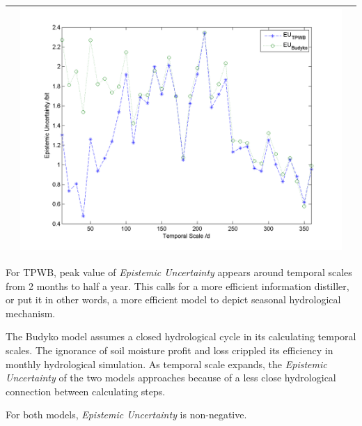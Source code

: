 \documentclass[11pt]{article}
\begin{document}
\begin{table}[H]
{\begin{tabular}{ccc}
&\begin{minipage}{.6\textwidth}\includegraphics[width=\linewidth]{resultgraph/11532500EU.png}\end{minipage}
\\
\bottomrule
\end{tabular}
}
\end{table} 

For TPWB, peak value of \emph{Epistemic Uncertainty} appears around temporal scales from 2 months to half a year. This calls for a more efficient information distiller, or put it in other words, a more efficient model to depict seasonal hydrological mechanism.  


The Budyko model assumes a closed hydrological cycle in its calculating temporal scales. The ignorance of soil moisture profit and loss crippled its efficiency in monthly hydrological simulation. As temporal scale expands, the \emph{Epistemic Uncertainty} of the two models approaches because of a less close hydrological connection between calculating steps.

For both models,  \emph{Epistemic Uncertainty} is non-negative.
\end{document}
